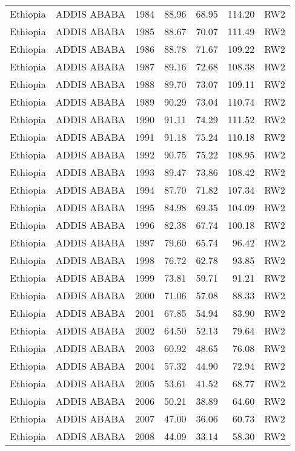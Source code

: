 \begin{longtable}{lllrrrl}
  Ethiopia & ADDIS ABABA & 1984 & 88.96 & 68.95 & 114.20 & RW2 \\ 
  Ethiopia & ADDIS ABABA & 1985 & 88.67 & 70.07 & 111.49 & RW2 \\ 
  Ethiopia & ADDIS ABABA & 1986 & 88.78 & 71.67 & 109.22 & RW2 \\ 
  Ethiopia & ADDIS ABABA & 1987 & 89.16 & 72.68 & 108.38 & RW2 \\ 
  Ethiopia & ADDIS ABABA & 1988 & 89.70 & 73.07 & 109.11 & RW2 \\ 
  Ethiopia & ADDIS ABABA & 1989 & 90.29 & 73.04 & 110.74 & RW2 \\ 
  Ethiopia & ADDIS ABABA & 1990 & 91.11 & 74.29 & 111.52 & RW2 \\ 
  Ethiopia & ADDIS ABABA & 1991 & 91.18 & 75.24 & 110.18 & RW2 \\ 
  Ethiopia & ADDIS ABABA & 1992 & 90.75 & 75.22 & 108.95 & RW2 \\ 
  Ethiopia & ADDIS ABABA & 1993 & 89.47 & 73.86 & 108.42 & RW2 \\ 
  Ethiopia & ADDIS ABABA & 1994 & 87.70 & 71.82 & 107.34 & RW2 \\ 
  Ethiopia & ADDIS ABABA & 1995 & 84.98 & 69.35 & 104.09 & RW2 \\ 
  Ethiopia & ADDIS ABABA & 1996 & 82.38 & 67.74 & 100.18 & RW2 \\ 
  Ethiopia & ADDIS ABABA & 1997 & 79.60 & 65.74 & 96.42 & RW2 \\ 
  Ethiopia & ADDIS ABABA & 1998 & 76.72 & 62.78 & 93.85 & RW2 \\ 
  Ethiopia & ADDIS ABABA & 1999 & 73.81 & 59.71 & 91.21 & RW2 \\ 
  Ethiopia & ADDIS ABABA & 2000 & 71.06 & 57.08 & 88.33 & RW2 \\ 
  Ethiopia & ADDIS ABABA & 2001 & 67.85 & 54.94 & 83.90 & RW2 \\ 
  Ethiopia & ADDIS ABABA & 2002 & 64.50 & 52.13 & 79.64 & RW2 \\ 
  Ethiopia & ADDIS ABABA & 2003 & 60.92 & 48.65 & 76.08 & RW2 \\ 
  Ethiopia & ADDIS ABABA & 2004 & 57.32 & 44.90 & 72.94 & RW2 \\ 
  Ethiopia & ADDIS ABABA & 2005 & 53.61 & 41.52 & 68.77 & RW2 \\ 
  Ethiopia & ADDIS ABABA & 2006 & 50.21 & 38.89 & 64.60 & RW2 \\ 
  Ethiopia & ADDIS ABABA & 2007 & 47.00 & 36.06 & 60.73 & RW2 \\ 
  Ethiopia & ADDIS ABABA & 2008 & 44.09 & 33.14 & 58.30 & RW2 \\ 

\end{longtable}
